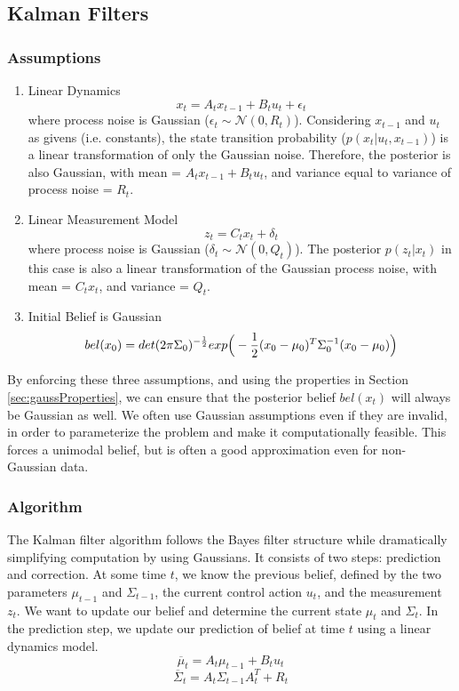 \documentclass[twoside]{article}
\begin{document}
\subsection{Kalman Filters}
\subsubsection{Assumptions}
\begin{enumerate}
    \item Linear Dynamics
    $$ x_t = A_t x_{t-1} + B_t u_t + \epsilon_t$$
    where process noise is Gaussian ($\epsilon_t \sim \mathcal{N}(0, R_t)$).
    Considering $x_{t-1}$ and $u_t$ as givens (i.e. constants),  the state transition probability ($p(x_t | u_t, x_{t-1})$) is a linear transformation of only the Gaussian noise. Therefore, the posterior is also Gaussian, with mean = $A_t x_{t-1} + B_t u_t$, and variance equal to variance of process noise = $R_t$.
    
    \item Linear Measurement Model
    $$z_t = C_t x_t + \delta_t$$
    where process noise is Gaussian ($\delta_t \sim \mathcal{N}(0, Q_t)$).
    The posterior $p(z_t | x_t)$ in this case is also a linear transformation of the Gaussian process noise, with mean = $C_t x_t$, and variance = $Q_t$.
    
    \item Initial Belief is Gaussian
    $$ bel(x_0) = det(2\pi\Sigma_0)^{-\frac{1}{2}}exp\Big{(}-\frac{1}{2}(x_0 - \mu_0)^T\Sigma_0^{-1}(x_0 - \mu_0)\Big{)}$$
    
\end{enumerate}
By enforcing these three assumptions, and using the properties in Section \ref{sec:gaussProperties}, we can ensure that the posterior belief $bel(x_t)$ will always be Gaussian as well. We often use Gaussian assumptions even if they are invalid, in order to parameterize the problem and make it computationally feasible. This forces a unimodal belief, but is often a good approximation even for non-Gaussian data.

\subsubsection{Algorithm}
The Kalman filter algorithm follows the Bayes filter structure while dramatically simplifying computation by using Gaussians. It consists of two steps: prediction and correction. At some time $t$, we know the previous belief, defined by the two parameters $\mu_{t-1}$ and $\Sigma_{t-1}$,  the current control action $u_t$, and the measurement $z_t$. We want to update our belief and determine the current state $\mu_t$ and $\Sigma_t$. In the prediction step, we update our prediction of belief at time $t$ using a linear dynamics model. 
\begin{equation}
    \overline{\mu}_t = A_t \mu_{t-1} + B_t u_t
\end{equation}
\begin{equation}
    \overline{\Sigma}_t = A_t \Sigma_{t-1} A_t^T + R_t
\end{equation}
\end{document}
